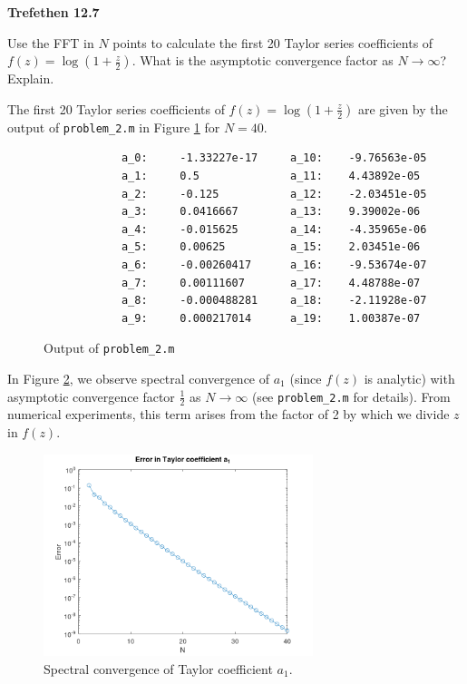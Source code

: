 \textbf{Trefethen 12.7}

Use the FFT in $N$ points to calculate the first 20 Taylor series coefficients of 
$f(z) = \log{\left(1 + \frac{z}{2}\right)}$. What is the asymptotic convergence factor as $N \to \infty$? Explain.
\begin{solution}
    The first 20 Taylor series coefficients of $f(z) = \log{\left(1 + \frac{z}{2}\right)}$ are given by the output of
    \texttt{problem\_2.m} in Figure \ref{fig:problem_2} for $N = 40$.

    \begin{figure}[h]
        \begin{verbatim}
            a_0:     -1.33227e-17     a_10:    -9.76563e-05 
            a_1:     0.5              a_11:    4.43892e-05 
            a_2:     -0.125           a_12:    -2.03451e-05  
            a_3:     0.0416667        a_13:    9.39002e-06 
            a_4:     -0.015625        a_14:    -4.35965e-06 
            a_5:     0.00625          a_15:    2.03451e-06 
            a_6:     -0.00260417      a_16:    -9.53674e-07 
            a_7:     0.00111607       a_17:    4.48788e-07 
            a_8:     -0.000488281     a_18:    -2.11928e-07 
            a_9:     0.000217014      a_19:    1.00387e-07
        \end{verbatim}
        \caption{Output of \texttt{problem\_2.m}}
        \label{fig:problem_2}
    \end{figure}

    In Figure \ref{fig:problem_2_convergence}, we observe spectral convergence of $a_1$ (since $f(z)$ is analytic) 
    with asymptotic convergence factor $\frac{1}{2}$ as $N \to \infty$ (see \texttt{problem\_2.m} for details). From
    numerical experiments, this term arises from the factor of 2 by which we divide $z$ in $f(z)$.

    \begin{figure}[h]
        \centering
        \includegraphics*[width=0.7\textwidth]{problem_2.png}
        \caption{Spectral convergence of Taylor coefficient $a_1$.}
        \label{fig:problem_2_convergence}
    \end{figure}
\end{solution}
